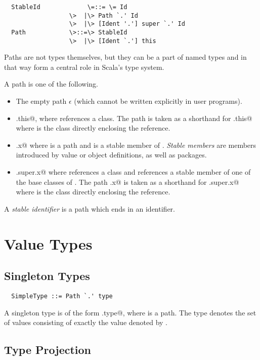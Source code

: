 \documentclass[11pt]{report}
\begin{document}
\syntax\begin{verbatim}
  StableId             \=::= \= Id
                  \>  |\> Path `.' Id
                  \>  |\> [Ident '.'] super `.' Id
  Path            \>::=\> StableId
                  \>  |\> [Ident `.'] this
\end{verbatim}

Paths are not types themselves, but they can be a part of named types
and in that way form a central role in Scala's type system.

A path is one of the following.
\begin{itemize}
\item
The empty path $\epsilon$ (which cannot be written explicitly in user programs).
\item
\verb@C.this@, where \verb@C@ references a class. 
The path \verb@this@ is taken as a shorthand for \verb@C.this@ where 
\verb@C@ is the class directly enclosing the reference. 
\item
\verb@p.x@ where \verb@p@ is a path and \verb@x@ is a stable member of \verb@p@.
{\em Stable members} are members introduced by value or object
definitions, as well as packages.
\item
\verb@C.super.x@ where \verb@C@ references a class and \verb@x@ references a 
stable member of
one of the base classes of \verb@C@. 
The path \verb@super.x@ is taken as a shorthand for \verb@C.super.x@ where 
\verb@C@ is the class directly enclosing the reference. 
\end{itemize}
A {\em stable identifier} is a path which ends in an identifier.

\section{Value Types}

\subsection{Singleton Types}
\label{sec:singleton-type}

\syntax\begin{verbatim}
  SimpleType ::= Path `.' type
\end{verbatim}

A singleton type is of the form \verb@p.type@, where \verb@p@ is a
path.  The type denotes the set of values consisting of
exactly the value denoted by \verb@p@.

\subsection{Type Projection}
\label{sec:type-project}
\end{document}
